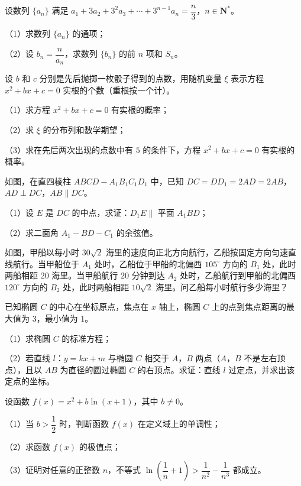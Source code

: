 \begin{question}
设数列 $\{a_n\}$ 满足 $a_1+3a_2+3^2a_3+\cdots+3^{n-1}a_n=\dfrac n3$，$n\in\mathbf N^*$。

（1）求数列 $\{a_n\}$ 的通项；

（2）设 $b_n=\dfrac{n}{a_n}$，求数列 $\{b_n\}$ 的前 $n$ 项和 $S_n$。

\end{question}
\begin{question}
设 $b$ 和 $c$ 分别是先后抛掷一枚骰子得到的点数，用随机变量 $\xi$ 表示方程 $x^2+bx+c=0$ 实根的个数（重根按一个计）。

（1）求方程 $x^2+bx+c=0$ 有实根的概率；

（2）求 $\xi$ 的分布列和数学期望；

（3）求在先后两次出现的点数中有 $5$ 的条件下，方程 $x^2+bx+c=0$ 有实根的概率。

\Needspace{0.4\textheight}
\end{question}
\begin{question}
如图，在直四棱柱 $ABCD-A_1B_1C_1D_1$ 中，已知 $DC=DD_1=2AD=2AB$，$AD\perp DC$，$AB\parallel DC$。

（1）设 $E$ 是 $DC$ 的中点，求证：$D_1E\parallel$ 平面 $A_1BD$；

（2）求二面角 $A_1-BD-C_1$ 的余弦值。
\nopagebreak[4]
\begin{center}\end{center}
\nopagebreak[4]
\Needspace{0.4\textheight}
\end{question}
\begin{question}
如图，甲船以每小时 $30\sqrt2$ 海里的速度向正北方向航行，乙船按固定方向匀速直线航行。当甲船位于 $A_1$ 处时，乙船位于甲船的北偏西 $105^\circ$ 方向的 $B_1$ 处，此时两船相距 $20$ 海里。当甲船航行 $20$ 分钟到达 $A_2$ 处时，乙船航行到甲船的北偏西 $120^\circ$ 方向的 $B_2$ 处，此时两船相距 $10\sqrt2$ 海里。问乙船每小时航行多少海里？
\nopagebreak[4]
\begin{center}\end{center}
\nopagebreak[4]
\end{question}
\begin{question}
已知椭圆 $C$ 的中心在坐标原点，焦点在 $x$ 轴上，椭圆 $C$ 上的点到焦点距离的最大值为 $3$，最小值为 $1$。

（1）求椭圆 $C$ 的标准方程；

（2）若直线 $l$：$y=kx+m$ 与椭圆 $C$ 相交于 $A$，$B$ 两点（$A$，$B$ 不是左右顶点），且以 $AB$ 为直径的圆过椭圆 $C$ 的右顶点。求证：直线 $l$ 过定点，并求出该定点的坐标。

\end{question}
\begin{question}
设函数 $f(x)=x^2+b\ln(x+1)$，其中 $b\neq0$。

（1）当 $b>\dfrac12$ 时，判断函数 $f(x)$ 在定义域上的单调性；

（2）求函数 $f(x)$ 的极值点；

（3）证明对任意的正整数 $n$，不等式 $\ln\left(\dfrac1n+1\right)>\dfrac1{n^2}-\dfrac1{n^3}$ 都成立。

\end{question}